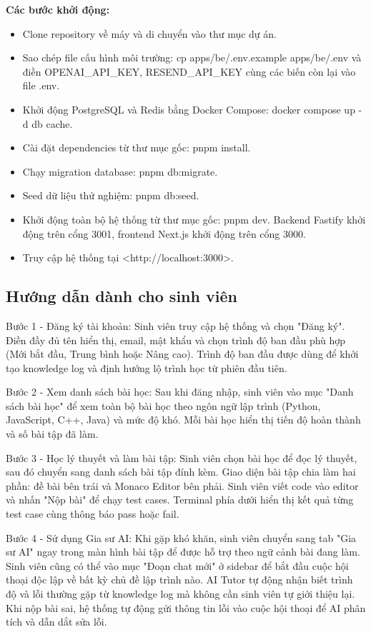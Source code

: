 \documentclass[../main.tex]{subfiles}
\begin{document}
\textbf{Các bước khởi động:}

\begin{itemize}
    \item Clone repository về máy và di chuyển vào thư mục dự án.
    \item Sao chép file cấu hình môi trường: cp apps/be/.env.example apps/be/.env và điền OPENAI\_API\_KEY, RESEND\_API\_KEY cùng các biến còn lại vào file .env.
    \item Khởi động PostgreSQL và Redis bằng Docker Compose: docker compose up -d db cache.
    \item Cài đặt dependencies từ thư mục gốc: pnpm install.
    \item Chạy migration database: pnpm db:migrate.
    \item Seed dữ liệu thử nghiệm: pnpm db:seed.
    \item Khởi động toàn bộ hệ thống từ thư mục gốc: pnpm dev. Backend Fastify khởi động trên cổng 3001, frontend Next.js khởi động trên cổng 3000.
    \item Truy cập hệ thống tại <http://localhost:3000>.
\end{itemize}

\subsection{Hướng dẫn dành cho sinh viên}

Bước 1 - Đăng ký tài khoản: Sinh viên truy cập hệ thống và chọn "Đăng ký". Điền đầy đủ tên hiển thị, email, mật khẩu và chọn trình độ ban đầu phù hợp (Mới bắt đầu, Trung bình hoặc Nâng cao). Trình độ ban đầu được dùng để khởi tạo knowledge log và định hướng lộ trình học từ phiên đầu tiên.

Bước 2 - Xem danh sách bài học: Sau khi đăng nhập, sinh viên vào mục "Danh sách bài học" để xem toàn bộ bài học theo ngôn ngữ lập trình (Python, JavaScript, C++, Java) và mức độ khó. Mỗi bài học hiển thị tiến độ hoàn thành và số bài tập đã làm.

Bước 3 - Học lý thuyết và làm bài tập: Sinh viên chọn bài học để đọc lý thuyết, sau đó chuyển sang danh sách bài tập đính kèm. Giao diện bài tập chia làm hai phần: đề bài bên trái và Monaco Editor bên phải. Sinh viên viết code vào editor và nhấn "Nộp bài" để chạy test cases. Terminal phía dưới hiển thị kết quả từng test case cùng thông báo pass hoặc fail.

Bước 4 - Sử dụng Gia sư AI: Khi gặp khó khăn, sinh viên chuyển sang tab "Gia sư AI" ngay trong màn hình bài tập để được hỗ trợ theo ngữ cảnh bài đang làm. Sinh viên cũng có thể vào mục "Đoạn chat mới" ở sidebar để bắt đầu cuộc hội thoại độc lập về bất kỳ chủ đề lập trình nào. AI Tutor tự động nhận biết trình độ và lỗi thường gặp từ knowledge log mà không cần sinh viên tự giới thiệu lại. Khi nộp bài sai, hệ thống tự động gửi thông tin lỗi vào cuộc hội thoại để AI phân tích và dẫn dắt sửa lỗi.
\end{document}
